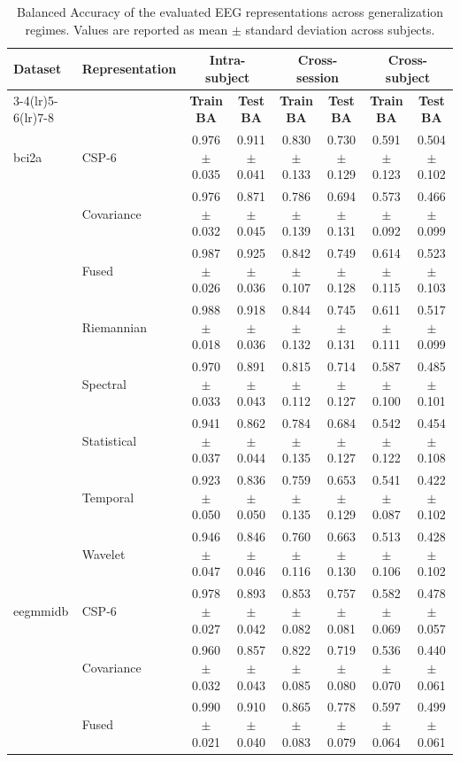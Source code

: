 \begin{table}[t]
\centering
\small
\caption{Balanced Accuracy of the evaluated EEG representations across generalization regimes. Values are reported as mean $\pm$ standard deviation across subjects.}
\label{tab:representation_summary}
\begin{tabular}{llcccccc}
\toprule
\textbf{Dataset} & \textbf{Representation} &
\multicolumn{2}{c}{\textbf{Intra-subject}} &
\multicolumn{2}{c}{\textbf{Cross-session}} &
\multicolumn{2}{c}{\textbf{Cross-subject}} \\
\cmidrule(lr){3-4}\cmidrule(lr){5-6}\cmidrule(lr){7-8}
& & \textbf{Train BA} & \textbf{Test BA} &
\textbf{Train BA} & \textbf{Test BA} &
\textbf{Train BA} & \textbf{Test BA} \\
\midrule
bci2a & CSP-6 & 0.976 $\pm$ 0.035 & 0.911 $\pm$ 0.041 & 0.830 $\pm$ 0.133 & 0.730 $\pm$ 0.129 & 0.591 $\pm$ 0.123 & 0.504 $\pm$ 0.102 \\
 & Covariance & 0.976 $\pm$ 0.032 & 0.871 $\pm$ 0.045 & 0.786 $\pm$ 0.139 & 0.694 $\pm$ 0.131 & 0.573 $\pm$ 0.092 & 0.466 $\pm$ 0.099 \\
 & Fused & 0.987 $\pm$ 0.026 & 0.925 $\pm$ 0.036 & 0.842 $\pm$ 0.107 & 0.749 $\pm$ 0.128 & 0.614 $\pm$ 0.115 & 0.523 $\pm$ 0.103 \\
 & Riemannian & 0.988 $\pm$ 0.018 & 0.918 $\pm$ 0.036 & 0.844 $\pm$ 0.132 & 0.745 $\pm$ 0.131 & 0.611 $\pm$ 0.111 & 0.517 $\pm$ 0.099 \\
 & Spectral & 0.970 $\pm$ 0.033 & 0.891 $\pm$ 0.043 & 0.815 $\pm$ 0.112 & 0.714 $\pm$ 0.127 & 0.587 $\pm$ 0.100 & 0.485 $\pm$ 0.101 \\
 & Statistical & 0.941 $\pm$ 0.037 & 0.862 $\pm$ 0.044 & 0.784 $\pm$ 0.135 & 0.684 $\pm$ 0.127 & 0.542 $\pm$ 0.122 & 0.454 $\pm$ 0.108 \\
 & Temporal & 0.923 $\pm$ 0.050 & 0.836 $\pm$ 0.050 & 0.759 $\pm$ 0.135 & 0.653 $\pm$ 0.129 & 0.541 $\pm$ 0.087 & 0.422 $\pm$ 0.102 \\
 & Wavelet & 0.946 $\pm$ 0.047 & 0.846 $\pm$ 0.046 & 0.760 $\pm$ 0.116 & 0.663 $\pm$ 0.130 & 0.513 $\pm$ 0.106 & 0.428 $\pm$ 0.102 \\
\midrule
eegmmidb & CSP-6 & 0.978 $\pm$ 0.027 & 0.893 $\pm$ 0.042 & 0.853 $\pm$ 0.082 & 0.757 $\pm$ 0.081 & 0.582 $\pm$ 0.069 & 0.478 $\pm$ 0.057 \\
 & Covariance & 0.960 $\pm$ 0.032 & 0.857 $\pm$ 0.043 & 0.822 $\pm$ 0.085 & 0.719 $\pm$ 0.080 & 0.536 $\pm$ 0.070 & 0.440 $\pm$ 0.061 \\
 & Fused & 0.990 $\pm$ 0.021 & 0.910 $\pm$ 0.040 & 0.865 $\pm$ 0.083 & 0.778 $\pm$ 0.079 & 0.597 $\pm$ 0.064 & 0.499 $\pm$ 0.061 \\

\end{tabular}
\end{table}
